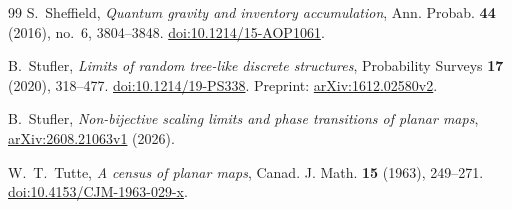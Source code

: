 \begin{thebibliography}{99}
S.~Sheffield,
\emph{Quantum gravity and inventory accumulation},
Ann. Probab. \textbf{44} (2016), no.~6, 3804--3848.
\href{https://doi.org/10.1214/15-AOP1061}{doi:10.1214/15-AOP1061}.

B.~Stufler,
\emph{Limits of random tree-like discrete structures},
Probability Surveys \textbf{17} (2020), 318--477.
\href{https://doi.org/10.1214/19-PS338}{doi:10.1214/19-PS338}.
Preprint: \href{https://arxiv.org/abs/1612.02580v2}{arXiv:1612.02580v2}.

B.~Stufler,
\emph{Non-bijective scaling limits and phase transitions of planar maps},
\href{https://arxiv.org/abs/2608.21063v1}{arXiv:2608.21063v1} (2026).

W.~T.~Tutte,
\emph{A census of planar maps},
Canad. J. Math. \textbf{15} (1963), 249--271.
\href{https://doi.org/10.4153/CJM-1963-029-x}{doi:10.4153/CJM-1963-029-x}.

\end{thebibliography}
